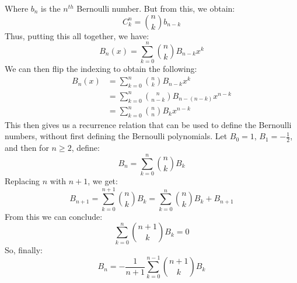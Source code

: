 \documentclass[crop=false,class=book,oneside]{standalone}
\begin{document}
            Where $b_{n}$ is the $n^{th}$ Bernoulli number.
            But from this, we obtain:
            \begin{equation}
                C_{k}^{n}=\binom{n}{k}b_{n-k}
            \end{equation}
            Thus, putting this all together, we have:
            \begin{equation}
                B_{n}(x)=\sum_{k=0}^{n}
                \binom{n}{k}B_{n-k}x^{k}
            \end{equation}
            We can then flip the indexing to obtain the following:
            \begin{align}
                B_{n}(x)&=
                \sum_{k=0}^{n}\binom{n}{k}B_{n-k}x^{k}\\
                &=\sum_{k=0}^{n}\binom{n}{n-k}
                B_{n-(n-k)}x^{n-k}\\
                &=\sum_{k=0}^{n}\binom{n}{n}B_{k}x^{n-k}
            \end{align}
            This then gives us a recurrence relation that can be
            used to define the Bernoulli numbers, without first
            defining the Bernoulli polynomials. Let
            $B_{0}=1$, $B_{1}=-\frac{1}{2}$, and then for
            $n\geq{2}$, define:
            \begin{equation}
                B_{n}=\sum_{k=0}^{n}
                \binom{n}{k}B_{k}
            \end{equation}
            Replacing $n$ with $n+1$, we get:
            \begin{equation}
                B_{n+1}=\sum_{k=0}^{n+1}
                \binom{n}{k}B_{k}
                =\sum_{k=0}^{n}
                \binom{n}{k}B_{k}+B_{n+1}
            \end{equation}
            From this we can conclude:
            \begin{equation}
                \sum_{k=0}^{n}\binom{n+1}{k}B_{k}=0
            \end{equation}
            So, finally:
            \begin{equation}
                B_{n}=-\frac{1}{n+1}\sum_{k=0}^{n-1}
                \binom{n+1}{k}B_{k}
            \end{equation}
\end{document}
